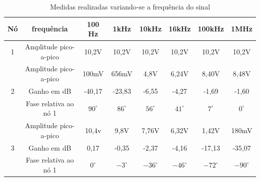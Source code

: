 \documentclass[a4paper]{article} %
\begin{document}
\begin{enumerate}

%
\begin{table}[h]
\begin{centering}
\caption{Medidas realizadas variando-se a frequência do sinal \label{tab:var-freq}}
\begin{tabular}{|c|c|c|c|c|c|c|c|}
\hline 
Nó & frequência & 100 Hz & 1kHz & 10kHz & 16kHz & 100kHz & 1MHz\tabularnewline
\hline
\hline 
1 & Amplitude pico-a-pico & 10,2V & 10,2V  & 10,2V & 10,2V & 10,2V  &10,2V \tabularnewline
\hline 
\multirow{3}{*}{2}
 & Amplitude pico-a-pico & 100mV & 656mV & 4,8V & 6,24V & 8,40V & 8,48V \tabularnewline
\cline{2-8} 
 & \multicolumn{1}{c|}{Ganho em dB} & -40,17 & -23,83  & -6,55 & -4,27  & -1,69  & -1,60 \tabularnewline
\cline{2-8} 

 & Fase relativa ao nó 1 & $90^{\circ}$ & $86^{\circ}$  & $56^{\circ}$  & $41^{\circ}$  & $7^{\circ}$  & $0^{\circ}$ \tabularnewline
\hline 
\multirow{3}{*}{3}
 & Amplitude pico-a-pico & 10,4v & 9,8V & 7,76V & 6,32V  & 1,42V  & 180mV \tabularnewline
\cline{2-8} 
 
 & Ganho em dB &  0,17 & -0,35  & -2,37 & -4,16 & -17,13 & -35,07\tabularnewline
\cline{2-8} 
 
 & Fase relativa ao nó 1 & $0^{\circ}$ & $-3^{\circ}$ & $-36^{\circ}$  & $-46^{\circ}$  & $-72^{\circ}$  & $-90^{\circ}$ \tabularnewline
\hline
\end{tabular}
\par\end{centering}

\end{table}


\end{enumerate}
\end{document}
